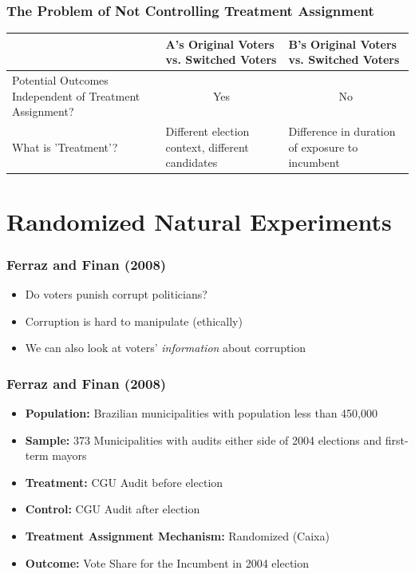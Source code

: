 \documentclass[xcolor=x11names,compress]{beamer}\usepackage[]{graphicx}\usepackage[]{color}
\renewcommand{\(}{\begin{columns}}
\renewcommand{\)}{\end{columns}}
\newcommand{\<}[1]{\begin{column}{#1}}
\renewcommand{\>}{\end{column}}
\begin{document}
\begin{frame}
\frametitle{The Problem of Not Controlling Treatment Assignment}
\footnotesize
\begin{table}[htbp]
  \centering
    \begin{tabular}{|p{3.2cm}|p{2.6cm}|p{2.6cm}|}
    \hline
          & \textbf{A's Original Voters vs. Switched Voters} & \textbf{B's Original Voters vs. Switched Voters} \bigstrut\\
    \hline
    Potential Outcomes Independent of Treatment Assignment? & \multicolumn{1}{c|}{\cellcolor[rgb]{ .776,  .878,  .706} Yes} & \multicolumn{1}{c|}{No} \bigstrut\\
    \hline
    What is 'Treatment'? & Different election context, different candidates & \cellcolor[rgb]{ .776,  .878,  .706} Difference in duration of exposure to incumbent \bigstrut\\
    \hline
    \end{tabular}%
  \label{tab:addlabel}%
\end{table}%
\normalsize
\end{frame}


\section{Randomized Natural Experiments}

\begin{frame}
\frametitle{Ferraz and Finan (2008)}
\begin{itemize}
\item Do voters punish corrupt politicians?
\pause
\item Corruption is hard to manipulate (ethically)
\pause
\item We can also look at voters' \textit{information} about corruption 
\end{itemize}
\end{frame}

\begin{frame}
\frametitle{Ferraz and Finan (2008)}
\begin{itemize}
\item \textbf{Population:} Brazilian municipalities with population less than 450,000
\item \textbf{Sample:} 373 Municipalities with audits either side of 2004 elections and first-term mayors
\item \textbf{Treatment:} CGU Audit before election
\item \textbf{Control:} CGU Audit after election
\item \textbf{Treatment Assignment Mechanism:} Randomized (Caixa)
\item \textbf{Outcome:} Vote Share for the Incumbent in 2004 election
\end{itemize}
\end{frame}
\end{document}
